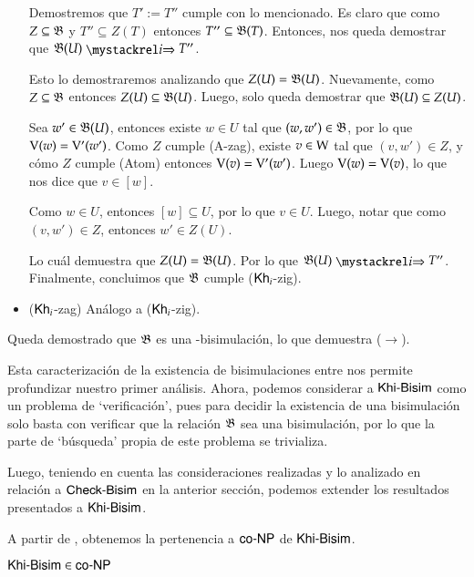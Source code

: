 \begin{demostracion}
\begin{itemize}
        Demostremos que $T' := T''$ cumple con lo mencionado. Es claro que como $Z \subseteq \mathfrak{B}$ y 
        $T'' \subseteq Z(T)$ entonces $T'' \subseteq \mathfrak{B}(T)$. Entonces, nos queda demostrar que $\universalbis(U) \ultsExecAgi T''$.
    
        Esto lo demostraremos analizando que $Z(U) = \mathfrak{B}(U)$. Nuevamente, como $Z \subseteq \mathfrak{B}$
        entonces $Z(U) \subseteq \mathfrak{B}(U)$. Luego, solo queda demostrar que $\mathfrak{B}(U) \subseteq Z(U)$.
    
        Sea $w' \in \mathfrak{B}(U)$, entonces existe $w \in U$ tal que $(w,w') \in \mathfrak{B}$, por lo que $\mathrm{V}(w) = \mathrm{V}'(w')$. 
        Como $Z$ cumple (A-zag), existe $v \in \mathrm{W}$ tal que $(v,w') \in Z$, y cómo $Z$ cumple 
        (Atom) entonces $\mathrm{V}(v) = \mathrm{V}'(w')$. Luego $\mathrm{V}(w) = \mathrm{V}(v)$, lo que nos dice que $v \in [w]$.
    
        Como $w \in U$, entonces $[w] \subseteq U$, por lo que $v \in U$. Luego, notar que como $(v,w') \in Z$, entonces
        $w' \in Z(U)$.
    
        Lo cuál demuestra que $Z(U) = \mathfrak{B}(U)$. Por lo que $\universalbis(U) \ultsExecAgi T''$. Finalmente, concluimos 
        que $\mathfrak{B}$ cumple ($\mathsf{Kh}_i$-zig).
    
    
        \item ($\mathsf{Kh}_i$-zag) Análogo a ($\mathsf{Kh}_i$-zig).
    \end{itemize}
    Queda demostrado que $\mathfrak{B}$ es una \KHilogic-bisimulación, lo que demuestra ($\rightarrow$).
\end{demostracion}

Esta caracterización de la existencia de bisimulaciones entre \ultss
nos permite profundizar nuestro primer análisis. Ahora, podemos considerar a $\rm\textsf{Khi-Bisim}$ como un problema de `verificación', 
pues para decidir la existencia de una bisimulación solo basta con verificar que la relación $\mathfrak{B}$ sea una bisimulación, por lo 
que la parte de `búsqueda' propia de este problema se trivializa.

Luego, teniendo en cuenta las consideraciones realizadas y lo analizado en relación a $\rm\textsf{Check-Bisim}$ en la anterior sección, podemos extender los 
resultados presentados a $\rm\textsf{Khi-Bisim}$.

A partir de , obtenemos la pertenencia a $\rm\textsf{co-NP}$ de $\rm\textsf{Khi-Bisim}$.

\begin{lema}\label{lema:khibisim-in-conp}
    $\rm\textsf{Khi-Bisim} \in \rm\textsf{co-NP}$ 
\end{lema}

